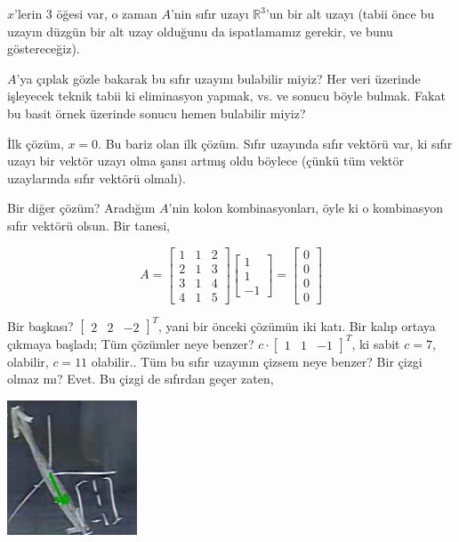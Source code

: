 \documentclass[12pt,fleqn]{article}\usepackage{../../common}
\begin{document}
$x$'lerin 3 öğesi var, o zaman $A$'nin sıfır uzayı $\mathbb{R}^3$'un bir
alt uzayı (tabii önce bu uzayın düzgün bir alt uzay olduğunu da
ispatlamamız gerekir, ve bunu göstereceğiz). 

$A$'ya çıplak gözle bakarak bu sıfır uzayını bulabilir miyiz? Her veri
üzerinde işleyecek teknik tabii ki eliminasyon yapmak, vs. ve sonucu böyle
bulmak. Fakat bu basit örnek üzerinde sonucu hemen bulabilir miyiz? 

İlk çözüm, $x=0$. Bu bariz olan ilk çözüm. Sıfır uzayında sıfır vektörü
var, ki sıfır uzayı bir vektör uzayı olma şansı artmış oldu böylece (çünkü
tüm vektör uzaylarında sıfır vektörü olmalı). 

Bir diğer çözüm? Aradığım $A$'nin kolon kombinasyonları, öyle ki o
kombinasyon sıfır vektörü olsun. Bir tanesi,

$$ A = 
\left[\begin{array}{rrr}
1 & 1 & 2 \\
2 & 1 & 3 \\
3 & 1 & 4 \\
4 & 1 & 5 
\end{array}\right]
\left[\begin{array}{r}
1  \\
1  \\
-1  
\end{array}\right] 
=
\left[\begin{array}{r}
0  \\
0  \\
0  \\
0  
\end{array}\right]
 $$

Bir başkası? $\left[\begin{array}{rrr}2 & 2 & -2\end{array}\right]^T$,
yani bir önceki çözümün iki katı. Bir kalıp ortaya çıkmaya başladı; Tüm
çözümler neye benzer? $c \cdot \left[\begin{array}{rrr}1 & 1 &
-1\end{array}\right]^T$, ki sabit $c=7$, olabilir, $c=11$
olabilir.. Tüm bu sıfır uzayının çizsem neye benzer? Bir çizgi olmaz mı?
Evet. Bu çizgi de sıfırdan geçer zaten,

\includegraphics[height=4cm]{6_02.png}
\end{document}
